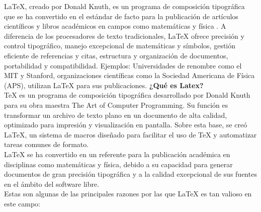 \documentclass[10pt,twocolumn,a4paper]{article}
\begin{document}
LaTeX, creado por Donald Knuth, es un programa de composición tipográfica que se ha convertido en el estándar de facto para la publicación de artículos científicos y libros académicos en campos como matemáticas y física \parencite{knuth1997art}.
A diferencia de los procesadores de texto tradicionales, LaTeX ofrece precisión y control tipográfico, manejo excepcional de matemáticas y símbolos, gestión eficiente de referencias y citas, estructura y organización de documentos, portabilidad y compatibilidad. 
Ejemplos: Universidades de renombre como el MIT y Stanford, organizaciones científicas como la Sociedad Americana de Física (APS), utilizan LaTeX para sus publicaciones.
\textbf{¿Qué es Latex?}\\
TeX es un programa de composición tipográfica desarrollado por Donald Knuth para su obra maestra The Art of Computer Programming. 
Su función es transformar un archivo de texto plano en un documento de alta calidad, optimizado para impresión y visualización en pantalla.\textcite{poley2000latex} 
Sobre esta base, se creó LaTeX, un sistema de macros diseñado para facilitar el uso de TeX y automatizar tareas comunes de formato.\\ 
LaTeX se ha convertido en un referente para la publicación académica en disciplinas como matemáticas y física, debido a su capacidad para generar documentos de gran precisión tipográfica y a la calidad excepcional de sus fuentes en el ámbito del software libre.\\
Estas son algunas de las principales razones por las que LaTeX es tan valioso en este campo:
\end{document}
